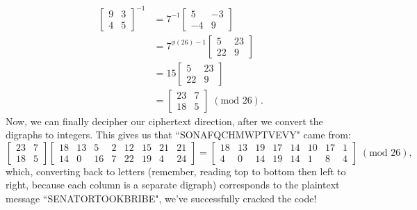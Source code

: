 \documentclass{article}
\begin{document}
\begin{align*}
    \begin{bmatrix}
        9 & 3 \\
        4 & 5
    \end{bmatrix}^{-1} &= 7^{-1} \begin{bmatrix}
        5 & -3 \\
        -4 & 9
    \end{bmatrix} \\
    &= 7^{\phi(26) - 1} \begin{bmatrix}
        5 & 23 \\
        22 & 9
    \end{bmatrix} \\
    &= 15 \begin{bmatrix}
        5 & 23 \\
        22 & 9
    \end{bmatrix} \\
    &= \begin{bmatrix}
        23 & 7 \\
        18 & 5
    \end{bmatrix} \; (\text{mod } 26).
\end{align*}
Now, we can finally decipher our ciphertext direction, after we convert the digraphs to integers. This gives us that ``SONAFQCHMWPTVEVY" came from:
\[
    \begin{bmatrix}
        23 & 7 \\
        18 & 5
    \end{bmatrix} \begin{bmatrix}
        18 & 13 & 5 & 2 & 12 & 15 & 21 & 21 \\
        14 & 0 & 16 & 7 & 22 & 19 & 4  & 24
    \end{bmatrix} = \begin{bmatrix}
        18 & 13 & 19 & 17 & 14 & 10 & 17 & 1 \\
        4 & 0 & 14 & 19 & 14 & 1 & 8 & 4
    \end{bmatrix} \; (\text{mod } 26),
\]
which, converting back to letters (remember, reading top to bottom then left to right, because each column is a separate digraph) corresponds to the plaintext message ``SENATORTOOKBRIBE", we've successfully cracked the code!
\end{document}
